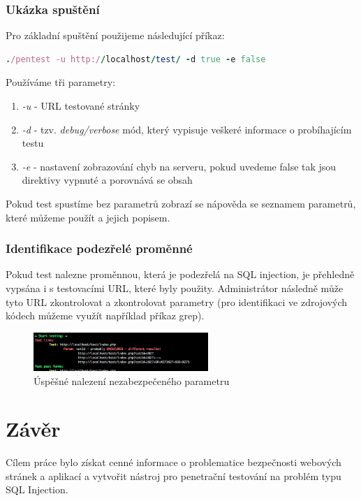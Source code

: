 \documentclass[12pt, a4paper]{report}
\begin{document}
\subsection{Ukázka spuštění}
Pro základní spuštění použijeme následující příkaz:
\begin{lstlisting}[label=SID_run,language=Ruby, caption=Spuštění testu]
./pentest -u http://localhost/test/ -d true -e false
\end{lstlisting}
Používáme tři parametry:
\begin{enumerate}
\item \textit{-u} - URL testované stránky
\item \textit{-d} - tzv. \textit{debug/verbose} mód, který vypisuje veškeré informace o probíhajícím testu
\item \textit{-e} - nastavení zobrazování chyb na serveru, pokud uvedeme false tak jsou direktivy vypnuté a porovnává se obsah
\end{enumerate}
Pokud test spustíme bez parametrů zobrazí se nápověda se seznamem parametrů, které můžeme použít a jejich popisem.

\subsection{Identifikace podezřelé proměnné}
Pokud test nalezne proměnnou, která je podezřelá na SQL injection, je přehledně vypsána i s testovacími URL, které byly použity. Administrátor následně může tyto URL zkontrolovat a zkontrolovat parametry (pro identifikaci ve zdrojových kódech můžeme využít například příkaz  grep).
\begin{figure}[h!]
\centerline{\includegraphics[width=250px]{./examples/SID-success.png}}
\caption{Úspěšné nalezení nezabezpečeného parametru}
\label{chart.attack}
\end{figure}

\chapter{Závěr}
Cílem práce bylo získat cenné informace o problematice bezpečnosti webových stránek a aplikací a vytvořit nástroj pro penetrační testování na problém typu SQL Injection.
\end{document}
